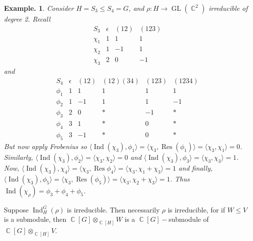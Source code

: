 \documentclass[11pt, a4paper]{memoir}
\DeclareMathOperator{\C}{{\mathbb{C}}}
\theoremstyle{change}
\theoremstyle{plain}
\theoremstyle{nonumberplain}
\newtheorem{example}{Example.}
\DeclareMathOperator{\GL}{GL}
\DeclareMathOperator{\Res}{Res}
\DeclareMathOperator{\Ind}{Ind}
\numberwithin{equation}{section}
\begin{document}
\begin{example}
    Consider $H=S_3\leq S_4=G$, and $\rho:H\to\GL(\C^2)$ irreducible of degree 2.
    Recall
    \begin{equation*}
        \begin{array}{c|ccc}
            S_3 & \epsilon & (12) & (123)\\
            \chi_1 & 1 & 1 & 1\\
            \chi_2 & 1 & -1 & 1\\
            \chi_3 & 2 & 0 & -1
        \end{array}
    \end{equation*}
    and
    \begin{equation*}
        \begin{array}{c|ccccc}
            S_4 & \epsilon & (12) & (12)(34) & (123) & (1234)\\
            \phi_1 & 1 & 1 & 1 & 1 & 1\\
            \phi_2 & 1 & -1 & 1 & 1 & -1\\
            \phi_3 & 2 & 0 &* & -1&*\\
            \phi_4 & 3 & 1 &* & 0&*\\
            \phi_5 & 3 & -1 &* & 0&*
        \end{array}
    \end{equation*}
    But now apply Frobenius so $\langle\Ind(\chi_3),\phi_1\rangle=\langle\chi_3,\Res(\phi_1)\rangle=\langle\chi_3,\chi_1\rangle=0$.
    Similarly, $\langle\Ind(\chi_3),\phi_2\rangle=\langle\chi_3,\chi_2\rangle=0$ and $\langle\Ind(\chi_3),\phi_3\rangle=\langle\chi_3,\chi_3\rangle=1$.
    Now, $\langle\Ind(\chi_3),\chi_4\rangle=\langle\chi_3,\Res\phi_4\rangle=\langle\chi_3,\chi_1+\chi_3\rangle=1$ and finally, $\langle\Ind(\chi_3),\phi_5\rangle=\langle\chi_3,\Res(\phi_5)\rangle=\langle\chi_3,\chi_2+\chi_3\rangle=1$.
    Thus $\Ind(\chi_\rho)=\phi_3+\phi_4+\phi_5$.
\end{example}
Suppose $\Ind_H^G(\rho)$ is irreducible.
Then necessarily $\rho$ is irreducible, for if $W\leq V$ is a submodule, then $\C[G]\otimes_{\C[H]}W$ is a $\C[G]-$submodule of $\C[G]\otimes_{\C[H]}V$.
\end{document}
